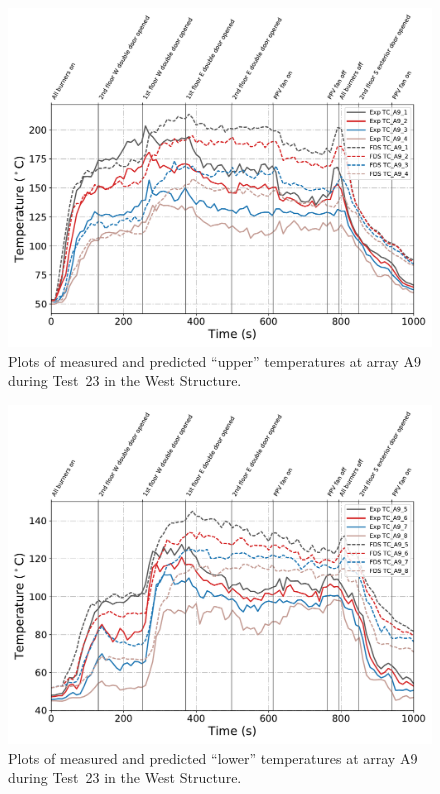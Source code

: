 \begin{figure}[!h]
	\centering
	\includegraphics[width=\columnwidth]{Figures/Plots/Validation/Temperature/Test_23_TC_A9_upper}
	\caption{Plots of measured and predicted ``upper'' temperatures at array A9 during Test~23 in the West Structure.}
	\label{fig:TCA9_upper_data_Test23}
\end{figure}
\begin{figure}[!h]
	\centering
	\includegraphics[width=\columnwidth]{Figures/Plots/Validation/Temperature/Test_23_TC_A9_lower}
	\caption{Plots of measured and predicted ``lower'' temperatures at array A9 during Test~23 in the West Structure.}
	\label{fig:TCA9_lower_data_Test23}
\end{figure}

